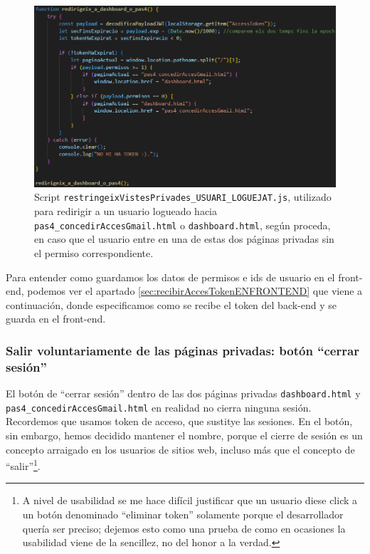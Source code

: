 \documentclass[a4paper,12pt]{report}
\begin{document}
	
	\setlength{\abovecaptionskip}{15pt}
	\FloatBarrier
	\begin{figure}[H]
		\centering
		\caption{Script \texttt{restringeixVistesPrivades\_USUARI\_LOGUEJAT.js}, utilizado para redirigir a un usuario logueado hacia \texttt{pas4\_concedirAccesGmail.html} o \texttt{dashboard.html}, según proceda, en caso que el usuario entre en una de estas dos páginas privadas sin el permiso correspondiente.}
		\includegraphics[width=1\linewidth]{img/restringeixVistesPrivadesUSUARINOLOGUEJAT.png}
		
		\label{fig:restringeixVistesPrivadesUSUARINOLOGUEJAT}
	\end{figure}
	\FloatBarrier	
	
	
	
	Para entender como guardamos los datos de permisos e ids de usuario en el front-end, podemos ver el apartado \ref{sec:recibirAccesTokenENFRONTEND} que viene a continuación, donde especificamos como se recibe el token del back-end y se guarda en el front-end.
	
	\subsubsection{Salir voluntariamente de las páginas privadas: botón ``cerrar sesión''}
	\label{sec:tancarSessioBotoExplicacio}
	
	El botón de ``cerrar sesión'' dentro de las dos páginas privadas \texttt{dashboard.html} y \texttt{pas4\_concedirAccesGmail.html} en realidad no cierra ninguna sesión. Recordemos que usamos token de acceso, que sustitye las sesiones. En el botón, sin embargo, hemos decidido mantener el nombre, porque el cierre de sesión es un concepto arraigado en los usuarios de sitios web, incluso más que el concepto de ``salir''\footnote{A nivel de usabilidad se me hace difícil justificar que un usuario diese click a un botón denominado ``eliminar token'' solamente porque el desarrollador quería ser preciso; dejemos esto como una prueba de como en ocasiones la usabilidad viene de la sencillez, no del honor a la verdad.}. 
	
\end{document}
